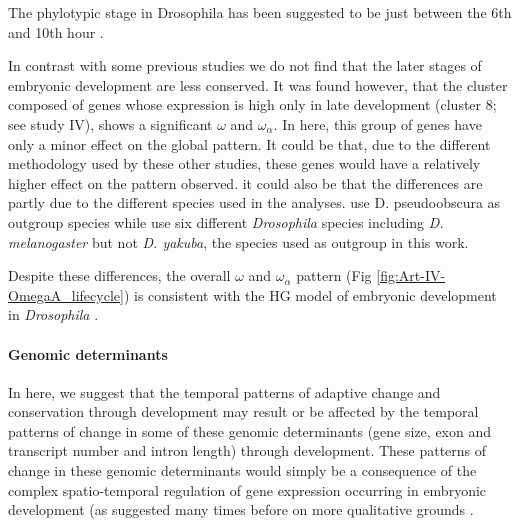 The phylotypic stage in Drosophila has been suggested to be just between the 6th and 10th hour \citep{Drost2015}.

In contrast with some previous studies \citep{Davis2005,Kalinka2010} we do not find that the later stages of embryonic development are less conserved. 
It was found however, that the cluster composed of genes whose expression is high only in late development (cluster 8; see study IV), shows a significant $\omega$ and $\omega_{\alpha}$. In here, this group of genes have only a minor effect on the global pattern. It could be that, due to the different methodology used by these other studies, these genes would have a relatively higher effect on the pattern observed. it could also be that the differences are partly due to the different species used in the analyses.\citet{Davis2005} use D. pseudoobscura as outgroup species while \citet{Kalinka2010} use six different \textit{Drosophila} species including \textit{D. melanogaster} but not \textit{D. yakuba}, the species used as outgroup in this work.

Despite these differences, the overall $\omega$ and $\omega_{\alpha}$ pattern (Fig \ref{fig:Art-IV-OmegaA_lifecycle}) is consistent with the HG model of embryonic development in \textit{Drosophila} \citep{Kalinka2010}.

\paragraph{Genomic determinants}

In here, we suggest that the temporal patterns of adaptive change and conservation through development may result or be affected by the temporal patterns of change in some of these genomic determinants (gene size, exon and transcript number and intron length) through development. 
These patterns of change in these genomic determinants would simply be a consequence of the complex spatio-temporal regulation of gene expression occurring in embryonic 
development (as suggested many times before on more qualitative grounds \citep{Duboule1998}.